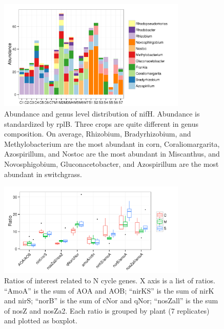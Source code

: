 \documentclass[12pt]{article}
\begin{document}
    \begin{figure}[tbph!]
    \centering
    \includegraphics[width=0.8\textwidth]{figures/xander-nifH-genus-rep}
    \caption[Abundance and genus level distribution of nifH]{Abundance and genus level distribution of nifH. Abundance is standardized by rplB. Three crops are quite different in genus composition. On average, Rhizobium, Bradyrhizobium, and Methylobacterium are the most abundant in corn, Coraliomargarita, Azospirillum, and Nostoc are the most abundant in Miscanthus, and Novosphigobium, Gluconacetobacter, and Azospirillum are the most abundant in switchgrass.}
    \label{fig:xander-nifH-genus-rep}
    \end{figure}

    \begin{figure}[tbph!]
    \centering
    \includegraphics[width=0.8\textwidth]{figures/xander-ncycle-ratio}
    \caption[Ratios of interest related to N cycle genes]{Ratios of interest related to N cycle genes. X axis is a list of ratios. ``AmoA'' is the sum of AOA and AOB; ``nirKS'' is the sum of nirK and nirS; ``norB'' is the sum of cNor and qNor; ``nosZall'' is the sum of nosZ and nosZa2. Each ratio is grouped by plant (7 replicates) and plotted as boxplot.}
    \label{fig:xander-ncycle-ratio}
    \end{figure}
\end{document}
